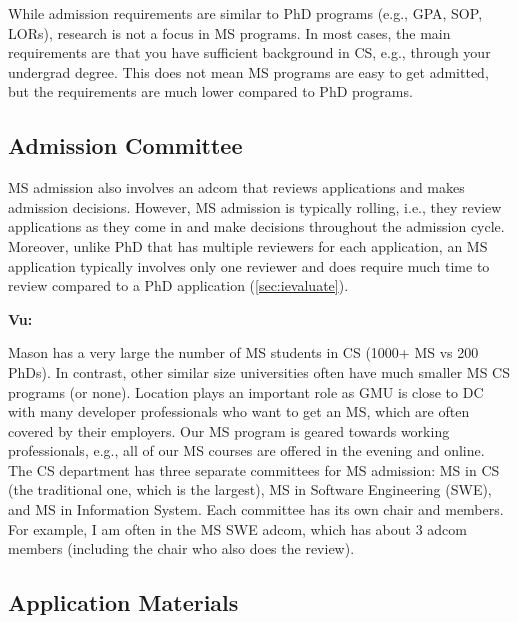 \documentclass[oneside,11pt,dvipsnames]{book}
\newenvironment{commentbox}[1][]{
  \small
  \begin{mybox}
    {\small \textbf{#1}}
  }{
  \end{mybox}
}
\begin{document}
While admission requirements are similar to PhD programs (e.g., GPA, SOP, LORs), research is not a focus in MS programs. In most cases, the main requirements are that you have sufficient background in CS, e.g., through your undergrad degree. This does not mean MS programs are easy to get admitted, but the requirements are much lower compared to PhD programs.

\subsection{Admission Committee}\label{sec:ms-adcom}
MS admission also involves an adcom that reviews applications and makes admission decisions. However, MS admission is typically rolling, i.e., they review applications as they come in and make decisions throughout the admission cycle.  Moreover, unlike PhD that has multiple reviewers for each application, an MS application typically involves only one reviewer and does require much time to review compared to a PhD application (\autoref{sec:ievaluate}). 

\begin{commentbox}[Vu:]
    Mason has a very large the number of MS students in CS (1000+ MS vs 200 PhDs). In contrast, other similar size universities often have much smaller MS CS programs (or none). Location plays an important role as GMU is close to DC with many developer professionals who want to get an MS, which are often covered by their employers.  Our MS program is geared towards working professionals, e.g., all of our MS courses are offered in the evening and online.
    \\
    
    The CS department has three separate committees for MS admission: MS in CS (the traditional one, which is the largest), MS in Software Engineering (SWE), and MS in Information System. 
    Each committee has its own chair and members. For example, I am often in the MS SWE adcom, which has about 3 adcom members (including the chair who also does the review). 
\end{commentbox}





\subsection{Application Materials}\label{sec:ms-application}
\end{document}
